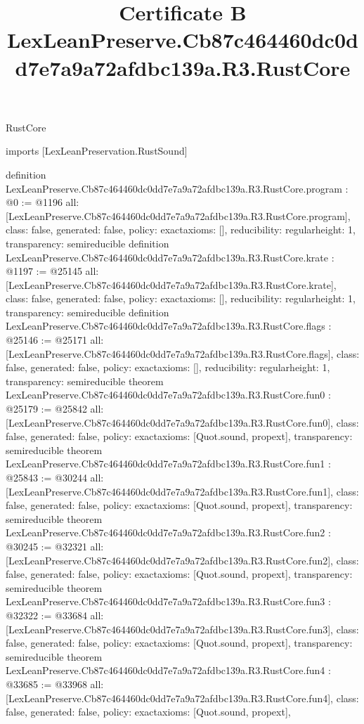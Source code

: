 \begin{lexlean}{RustCore}
\title{Certificate B LexLeanPreserve.Cb87c464460dc0dd7e7a9a72afdbc139a.R3.RustCore}
\begin{coremodule}
imports [LexLeanPreservation.RustSound]

definition LexLeanPreserve.Cb87c464460dc0dd7e7a9a72afdbc139a.R3.RustCore.program : @0 := @1196 {
  all: [LexLeanPreserve.Cb87c464460dc0dd7e7a9a72afdbc139a.R3.RustCore.program],
  class: false,
  generated: false,
  policy: exact{axioms: []},
  reducibility: regular{height: 1},
  transparency: semireducible
}
definition LexLeanPreserve.Cb87c464460dc0dd7e7a9a72afdbc139a.R3.RustCore.krate : @1197 := @25145 {
  all: [LexLeanPreserve.Cb87c464460dc0dd7e7a9a72afdbc139a.R3.RustCore.krate],
  class: false,
  generated: false,
  policy: exact{axioms: []},
  reducibility: regular{height: 1},
  transparency: semireducible
}
definition LexLeanPreserve.Cb87c464460dc0dd7e7a9a72afdbc139a.R3.RustCore.flags : @25146 := @25171 {
  all: [LexLeanPreserve.Cb87c464460dc0dd7e7a9a72afdbc139a.R3.RustCore.flags],
  class: false,
  generated: false,
  policy: exact{axioms: []},
  reducibility: regular{height: 1},
  transparency: semireducible
}
theorem LexLeanPreserve.Cb87c464460dc0dd7e7a9a72afdbc139a.R3.RustCore.fun0 : @25179 := @25842 {
  all: [LexLeanPreserve.Cb87c464460dc0dd7e7a9a72afdbc139a.R3.RustCore.fun0],
  class: false,
  generated: false,
  policy: exact{axioms: [Quot.sound, propext]},
  transparency: semireducible
}
theorem LexLeanPreserve.Cb87c464460dc0dd7e7a9a72afdbc139a.R3.RustCore.fun1 : @25843 := @30244 {
  all: [LexLeanPreserve.Cb87c464460dc0dd7e7a9a72afdbc139a.R3.RustCore.fun1],
  class: false,
  generated: false,
  policy: exact{axioms: [Quot.sound, propext]},
  transparency: semireducible
}
theorem LexLeanPreserve.Cb87c464460dc0dd7e7a9a72afdbc139a.R3.RustCore.fun2 : @30245 := @32321 {
  all: [LexLeanPreserve.Cb87c464460dc0dd7e7a9a72afdbc139a.R3.RustCore.fun2],
  class: false,
  generated: false,
  policy: exact{axioms: [Quot.sound, propext]},
  transparency: semireducible
}
theorem LexLeanPreserve.Cb87c464460dc0dd7e7a9a72afdbc139a.R3.RustCore.fun3 : @32322 := @33684 {
  all: [LexLeanPreserve.Cb87c464460dc0dd7e7a9a72afdbc139a.R3.RustCore.fun3],
  class: false,
  generated: false,
  policy: exact{axioms: [Quot.sound, propext]},
  transparency: semireducible
}
theorem LexLeanPreserve.Cb87c464460dc0dd7e7a9a72afdbc139a.R3.RustCore.fun4 : @33685 := @33968 {
  all: [LexLeanPreserve.Cb87c464460dc0dd7e7a9a72afdbc139a.R3.RustCore.fun4],
  class: false,
  generated: false,
  policy: exact{axioms: [Quot.sound, propext]},
}
\end{coremodule}
\end{lexlean}
